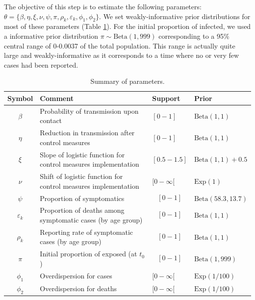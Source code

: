\documentclass{article}
\begin{document}
	The objective of this step is to estimate the following parameters: $\theta=\{\beta, \eta, \xi, \nu, \psi, \pi, \rho_k, \varepsilon_k, \phi_1, \phi_2 \}$. We set weakly-informative prior distributions for most of these parameters (Table \ref{prior}).
	For the initial proportion of infected, we used a informative prior distribution $\pi \sim \text{Beta}(1,999)$ corresponding to a 95\% central range of 0-0.0037 of the total population. This range is actually quite large and weakly-informative as it corresponds to a time where no or very few cases had been reported.
	
	\begin{table}[h]
		\centering
		\begin{tabular}{cp{8cm}ll}
			\hline
			Symbol & Comment & Support & Prior \\
			\hline 
			$\beta$ & Probability of transmission upon contact & $[0-1]$ & $\text{Beta}(1,1)$  \\
			$\eta$ & Reduction in transmission after control measures & $[0-1]$ & $\text{Beta}(1,1)$ \\
			$\xi$ & Slope of logistic function for control measures implementation & $[0.5-1.5]$ & $ \text{Beta}(1,1) + 0.5$  \\
			$\nu$ & Shift of logistic function for control measures implementation & $[0-\infty[$ & $\text{Exp}(1)$  \\
			$\psi$ & Proportion of symptomatics & $$[0-1]$$ & $\text{Beta}(58.3,13.7)$ \\
			$\varepsilon_k$ & Proportion of deaths among symptomatic cases (by age group) & $$[0-1]$$ & $\text{Beta}(1,1)$  \\
			$\rho_k$ & Reporting rate of symptomatic cases (by age group) & $$[0-1]$$ & $\text{Beta}(1,1)$  \\
			$\pi$ & Initial proportion of exposed (at $t_0$) & $$[0-1]$$ & $\text{Beta}(1,999)$  \\
			$\phi_1$ & Overdispersion for cases & $[0-\infty[$ & $\text{Exp}(1/100)$  \\
			$\phi_2$ & Overdispersion for deaths & $[0-\infty[$ & $\text{Exp}(1/100)$  \\
			
			\hline 
		\end{tabular} 
		\caption{Summary of parameters.}\label{prior}
	\end{table}
	
\end{document}
